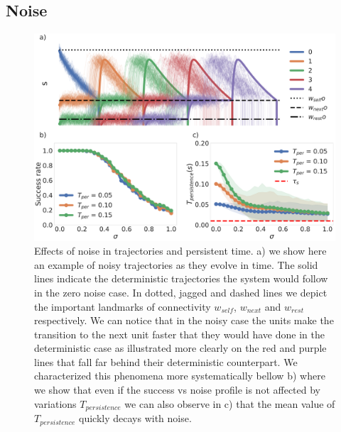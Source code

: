 \documentclass[10pt,a4paper]{article}
\begin{document}
\subsection{Noise}

\begin{figure}[H]
\centering
\includegraphics[scale=0.17]{noise_diagram.pdf}
\caption{Effects of noise in trajectories and persistent time. a) we show here an example of noisy trajectories as they evolve in time. The solid lines indicate the deterministic trajectories the system would follow in the zero noise case. In dotted, jagged and dashed lines we depict the important landmarks of connectivity $w_{self}$, $w_{next}$ and $w_{rest}$ respectively. We can notice that in the noisy case the units make the transition to the next unit faster that they would have done in the deterministic case as illustrated more clearly on the red and purple lines that fall far behind their deterministic counterpart. We characterized this phenomena more systematically bellow b) where we show that even if the success vs noise profile is not affected by variations $T_{persistence}$ we can also observe in c) that the mean value of $T_{persistence}$ quickly decays with noise.}
\label{fig:noise_scheme}
\end{figure}
\end{document}
